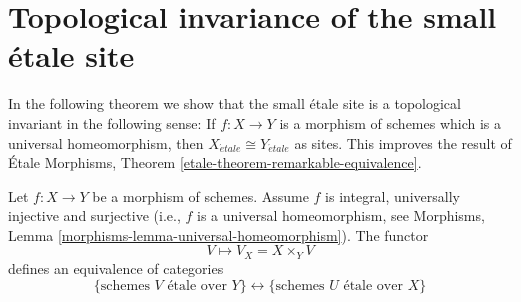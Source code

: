 \section{Topological invariance of the small \'etale site}
\label{section-topological-invariance}

\noindent
In the following theorem we show that the small \'etale site is a topological
invariant in the following sense: If $f : X \to Y$ is a morphism of schemes
which is a universal homeomorphism, then
$X_{\acute{e}tale} \cong Y_{\acute{e}tale}$
as sites. This improves the result of
\'Etale Morphisms, Theorem \ref{etale-theorem-remarkable-equivalence}.

\begin{theorem}
\label{theorem-topological-invariance}
Let $f : X \to Y$ be a morphism of schemes.
Assume $f$ is integral, universally injective and surjective
(i.e., $f$ is a universal homeomorphism, see
Morphisms, Lemma \ref{morphisms-lemma-universal-homeomorphism}).
The functor
$$
V \longmapsto V_X = X \times_Y V
$$
defines an equivalence of categories
$$
\{
\text{schemes }V\text{ \'etale over }Y
\}
\leftrightarrow
\{
\text{schemes }U\text{ \'etale over }X
\}
$$
\end{theorem}

